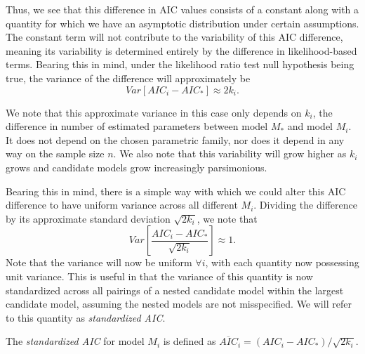 		Thus, we see that this difference in AIC values consists of a constant along with a quantity for which we have an asymptotic distribution under certain
		assumptions. The constant term will not contribute to the variability of this AIC difference, meaning its variability is determined entirely by the
		difference in likelihood-based terms. Bearing this in mind, under the likelihood ratio test null hypothesis being true, the variance of the difference
		will approximately be
		\begin{equation}
			Var[AIC_i - AIC_*] \approx 2 k_i .
		\end{equation}

		We note that this approximate variance in this case only depends on $k_i$, the difference in number of estimated parameters between model $M_*$ and model $M_i$. It does not
		depend on the chosen parametric family, nor does it depend in any way on the sample size $n$. We also note that this variability will grow higher as $k_i$ grows and candidate
		models grow increasingly parsimonious.

		Bearing this in mind, there is a simple way with which we could alter this AIC difference to have uniform variance across all different $M_i$. Dividing the difference
		by its approximate standard deviation $\sqrt{2 k_i}$, we note that
		\begin{equation}
			Var \left[ \frac{AIC_i - AIC_*}{\sqrt{2k_i}} \right] \approx 1 .
		\end{equation}
		Note that the variance will now be uniform $\forall i$, with each quantity now possessing unit variance. This is useful in that the variance of this quantity is now standardized
		across all pairings of a nested candidate model within the largest candidate model, assuming the nested models are not misspecified. We will refer to this quantity as
		\textit{standardized AIC}.

		\begin{definition}
			The \textit{standardized AIC} for model $M_i$ is defined as $\overline{AIC}_i = (AIC_i - AIC_*) / \sqrt{2k_i}$.
		\end{definition}

